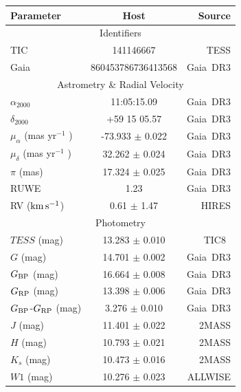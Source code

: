 \documentclass{nature3}
\newcommand{\kms}{\ensuremath{\rm km\,s^{-1}}}
\begin{document}
\begin{methods}
%
\begin{table}
    \centering
    \begin{tabular}{lcr}
    \hline 
    \hline
    Parameter & Host & Source \\
    \hline 
    \multicolumn{3}{c}{Identifiers} \\
    \hline
    TIC & 141146667 & TESS \\
    Gaia & 860453786736413568 & Gaia\ DR3 \\
    \hline
    \multicolumn{3}{c}{Astrometry \& Radial Velocity} \\ 
    \hline
    $\alpha_{2000}$ & 11:05:15.09   & Gaia\ DR3 \\
    $\delta_{2000}$ & +59 15 05.57  & Gaia\ DR3 \\
    $\mu_{\alpha}$ (mas yr$^{-1}$ ) & -73.933 $\pm$ 0.022 & Gaia\ DR3 \\
    $\mu_{\delta}$ (mas yr$^{-1}$ ) &  32.262 $\pm$ 0.024 & Gaia\ DR3 \\
    $\pi$ (mas)                     &  17.324 $\pm$ 0.025 & Gaia\ DR3 \\
    RUWE                            &  1.23               & Gaia\ DR3 \\
    RV (\kms)                     & 0.61 $\pm$ 1.47     & HIRES \\
    \hline
    \multicolumn{3}{c}{Photometry} \\
    \hline
    $TESS$ (mag)                    & 13.283 $\pm$ 0.010 & TIC8\     \\
    $G$ (mag)                       & 14.701 $\pm$ 0.002 & Gaia\ DR3 \\
    $G_{\rm BP}$ (mag)              & 16.664 $\pm$ 0.008 & Gaia\ DR3 \\
    $G_{\rm RP}$ (mag)              & 13.398 $\pm$ 0.006 & Gaia\ DR3 \\
    $G_{\rm BP}$-$G_{\rm RP}$ (mag) &  3.276 $\pm$ 0.010 & Gaia\ DR3 \\
    $J$ (mag)                       & 11.401 $\pm$ 0.022 & 2MASS     \\
    $H$ (mag)                       & 10.793 $\pm$ 0.021 & 2MASS     \\
    $K_s$ (mag)                     & 10.473 $\pm$ 0.016 & 2MASS     \\
    $W1$ (mag)                      & 10.276 $\pm$ 0.023 & ALLWISE   \\ %

\end{tabular}
\end{table}
\end{methods}
\end{document}

